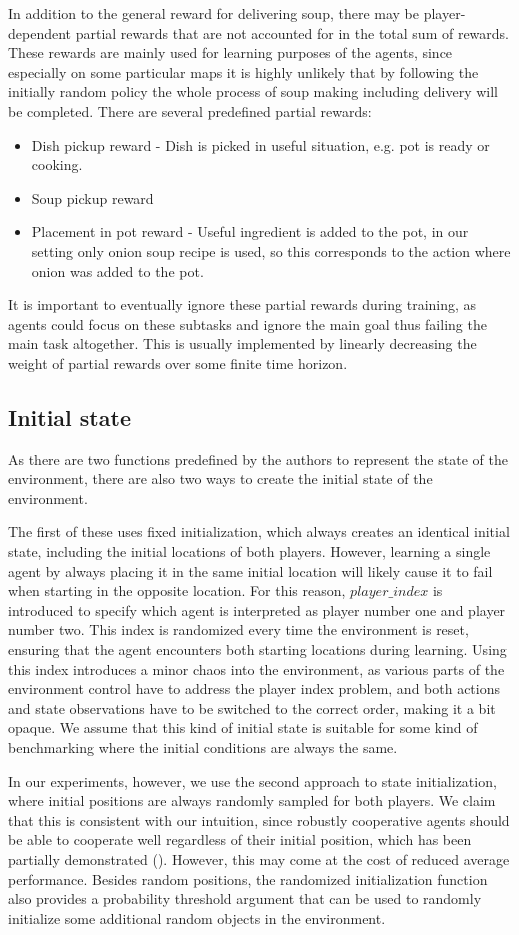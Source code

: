 In addition to the general reward for delivering soup, there may be player-dependent partial rewards that are not accounted for in the total sum of rewards.
These rewards are mainly used for learning purposes of the agents, since especially on some particular maps it is highly unlikely that by following the initially random policy the whole process of soup making including delivery will be completed.
There are several predefined partial rewards:
\begin{itemize}
    \item Dish pickup reward - Dish is picked in useful situation, e.g. pot is ready or cooking.
    \item Soup pickup reward 
    \item Placement in pot reward - Useful ingredient is added to the pot, in our setting only onion soup recipe is used, so this corresponds to the action where onion was added to the pot.
\end{itemize}
It is important to eventually ignore these partial rewards during training, as agents could focus on these subtasks and ignore the main goal thus failing the main task altogether.
This is usually implemented by linearly decreasing the weight of partial rewards over some finite time horizon.


\subsection{Initial state}
As there are two functions predefined by the authors to represent the state of the environment, there are also two ways to create the initial state of the environment.

The first of these uses fixed initialization, which always creates an identical initial state, including the initial locations of both players.
However, learning a single agent by always placing it in the same initial location will likely cause it to fail when starting in the opposite location.
For this reason, $player\_index$ is introduced to specify which agent is interpreted as player number one and player number two.
This index is randomized every time the environment is reset, ensuring that the agent encounters both starting locations during learning.
Using this index introduces a minor chaos into the environment, as various parts of the environment control have to address the player index problem, and both actions and state observations have to be switched to the correct order, making it a bit opaque.
We assume that this kind of initial state is suitable for some kind of benchmarking where the initial conditions are always the same.

In our experiments, however, we use the second approach to state initialization, where initial positions are always randomly sampled for both players.
We claim that this is consistent with our intuition, since robustly cooperative agents should be able to cooperate well regardless of their initial position, which has been partially demonstrated (\cite{knott2021evaluating}).
However, this may come at the cost of reduced average performance.
Besides random positions, the randomized initialization function also provides a probability threshold argument that can be used to randomly initialize some additional random objects in the environment.
